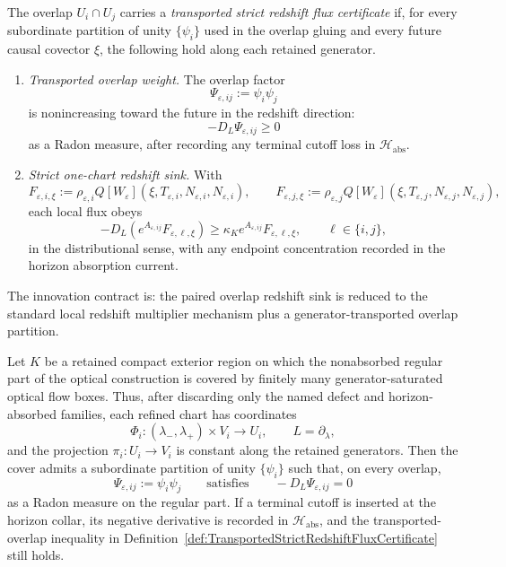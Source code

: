 \begin{definition}\label{def:TransportedStrictRedshiftFluxCertificate}
The overlap $U_i\cap U_j$ carries a \emph{transported strict redshift flux certificate} if, for every subordinate partition of unity $\{\psi_i\}$ used in the overlap gluing and every future causal covector $\xi$, the following hold along each retained generator.
\begin{enumerate}
    \item \emph{Transported overlap weight.} The overlap factor
    \[
        \Psi_{\varepsilon,ij}:=\psi_i\psi_j
    \]
    is nonincreasing toward the future in the redshift direction:
    \[
        -D_L\Psi_{\varepsilon,ij}\ge0
    \]
    as a Radon measure, after recording any terminal cutoff loss in $\mathcal H_{\mathrm{abs}}$.
    \item \emph{Strict one-chart redshift sink.} With
    \[
        F_{\varepsilon,i,\xi}
        :=
        \rho_{\varepsilon,i}
        Q[W_\varepsilon](\xi,T_{\varepsilon,i},N_{\varepsilon,i},N_{\varepsilon,i}),
        \qquad
        F_{\varepsilon,j,\xi}
        :=
        \rho_{\varepsilon,j}
        Q[W_\varepsilon](\xi,T_{\varepsilon,j},N_{\varepsilon,j},N_{\varepsilon,j}),
    \]
    each local flux obeys
    \[
        -D_L(e^{A_{\varepsilon,ij}}F_{\varepsilon,\ell,\xi})
        \ge
        \kappa_K e^{A_{\varepsilon,ij}}F_{\varepsilon,\ell,\xi},
        \qquad
        \ell\in\{i,j\},
    \]
    in the distributional sense, with any endpoint concentration recorded in the horizon absorption current.
\end{enumerate}
The innovation contract is: the paired overlap redshift sink is reduced to the standard local redshift multiplier mechanism plus a generator-transported overlap partition.
\end{definition}

\begin{lemma}\label{lem:FlowBoxTransportedOverlapPartitions}
Let $K$ be a retained compact exterior region on which the nonabsorbed regular part of the optical construction is covered by finitely many generator-saturated optical flow boxes.  Thus, after discarding only the named defect and horizon-absorbed families, each refined chart has coordinates
\[
    \Phi_i:(\lambda_-,\lambda_+)\times V_i\longrightarrow U_i,
    \qquad
    L=\partial_\lambda,
\]
and the projection $\pi_i:U_i\to V_i$ is constant along the retained generators.  Then the cover admits a subordinate partition of unity $\{\psi_i\}$ such that, on every overlap,
\[
    \Psi_{\varepsilon,ij}:=\psi_i\psi_j
    \qquad\text{satisfies}\qquad
    -D_L\Psi_{\varepsilon,ij}=0
\]
as a Radon measure on the regular part.  If a terminal cutoff is inserted at the horizon collar, its negative derivative is recorded in $\mathcal H_{\mathrm{abs}}$, and the transported-overlap inequality in Definition~\ref{def:TransportedStrictRedshiftFluxCertificate} still holds.
\end{lemma}

